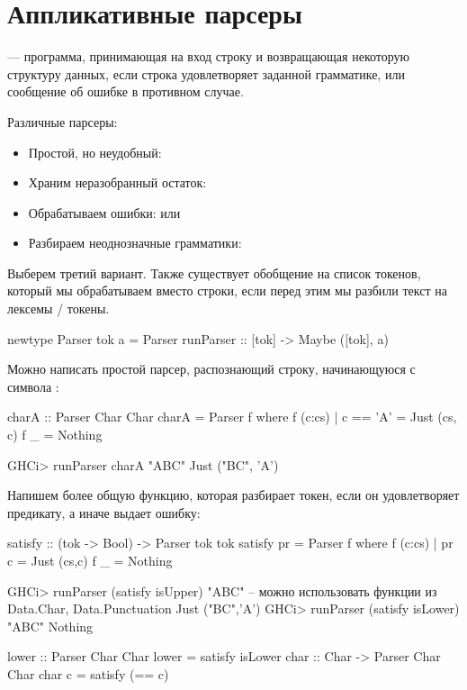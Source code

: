 \documentclass[11pt,a4paper]{article}
\begin{document}
\subsection{}



\section{Аппликативные парсеры}
\begin{defn}
	 --- программа, принимающая на вход строку и возвращающая некоторую структуру данных, если строка удовлетворяет заданной грамматике, или сообщение об ошибке в противном случае.
\end{defn}
Различные парсеры:
\begin{itemize}
	\item Простой, но неудобный: 
	\item Храним неразобранный остаток: 
	\item Обрабатываем ошибки:  или 

	\item Разбираем неоднозначные грамматики: 
\end{itemize}
Выберем третий вариант. Также существует обобщение на список токенов, который мы обрабатываем вместо строки, если перед этим мы разбили текст на лексемы / токены.
\begin{hscode}
newtype Parser tok a = Parser { runParser :: [tok] -> Maybe ([tok], a) }
\end{hscode}
Можно написать простой парсер, распознающий строку, начинающуюся с символа :
\begin{hscode}
charA :: Parser Char Char
charA = Parser f where
  f (c:cs) | c == 'A' = Just (cs, c)
  f _ = Nothing

GHCi> runParser charA "ABC"
Just ("BC", 'A')
\end{hscode}
Напишем более общую функцию, которая разбирает токен, если он удовлетворяет предикату, а иначе выдает ошибку:
\begin{hscode}
satisfy :: (tok -> Bool) -> Parser tok tok
satisfy pr = Parser f where
	f (c:cs) | pr c = Just (cs,c)
	f _ = Nothing

GHCi> runParser (satisfy isUpper) "ABC"  -- можно использовать функции из Data.Char, Data.Punctuation 
Just ("BC",'A')
GHCi> runParser (satisfy isLower) "ABC"
Nothing

lower :: Parser Char Char
lower = satisfy isLower
char :: Char -> Parser Char Char
char c = satisfy (== c) 
\end{hscode}
\end{document}
